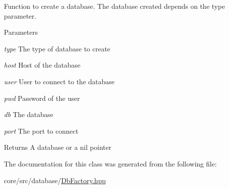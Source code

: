 Function to create a database. The database created depends on the type parameter. 


\begin{DoxyParams}{Parameters}
\item[{\em type}]The type of database to create \item[{\em host}]Host of the database \item[{\em user}]User to connect to the database \item[{\em pwd}]Password of the user \item[{\em db}]The database \item[{\em port}]The port to connect \end{DoxyParams}
\begin{DoxyReturn}{Returns}
A database or a nil pointer 
\end{DoxyReturn}


The documentation for this class was generated from the following file:\begin{DoxyCompactItemize}
\item 
core/src/database/\hyperlink{DbFactory_8hpp}{DbFactory.hpp}\end{DoxyCompactItemize}
